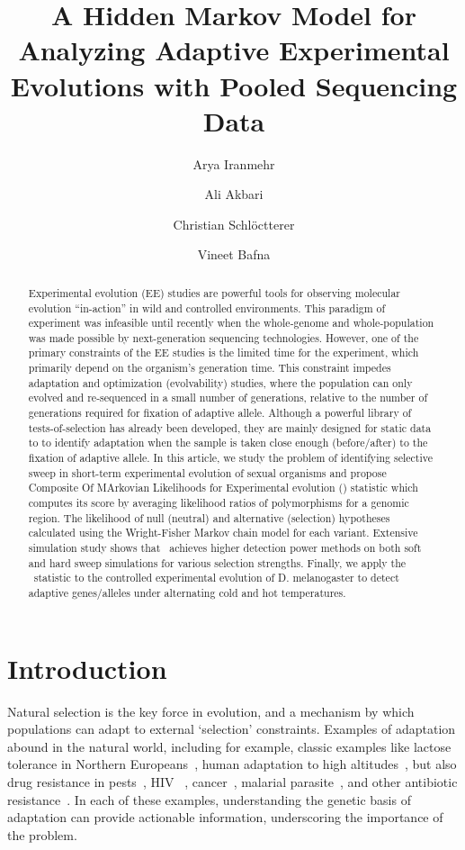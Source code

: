 \documentclass[11pt]{article}
\title{A Hidden Markov Model for Analyzing Adaptive Experimental Evolutions with Pooled Sequencing Data}
\author[1]{Arya Iranmehr}
\author[1]{Ali Akbari}
\author[2]{Christian Schl\"{o}ctterer}
\author[3]{Vineet Bafna}
\affil[1]{\footnotesize Electrical and Computer Engineering, University of California, San Diego, La Jolla, CA 92093, USA.}
\affil[2]{\footnotesize Institut für Populationsgenetik, Vetmeduni, Vienna, Austria.}
\affil[3]{\footnotesize Computer Science \& Engineering, University of California, San Diego, La Jolla, CA 92093, USA}
\date{}
\def\comale{\text{COMALE }}
\begin{document}
\maketitle
\begin{abstract}
  Experimental evolution (EE) studies are powerful tools for observing
  molecular evolution ``in-action'' in wild and controlled
  environments. This paradigm of experiment was infeasible until
  recently when the whole-genome and whole-population was made
  possible by next-generation sequencing technologies.  However, one
  of the primary constraints of the EE studies is the limited time for
  the experiment, which primarily depend on the organism's generation
  time. This constraint impedes adaptation and optimization
  (evolvability) studies, where the population can only evolved and
  re-sequenced in a small number of generations, relative to the
  number of generations required for fixation of adaptive allele.
  Although a powerful library of tests-of-selection has already been
  developed, they are mainly designed for static data to to identify
  adaptation when the sample is taken close enough (before/after) to
  the fixation of adaptive allele.  In this article, we study the
  problem of identifying selective sweep in short-term experimental
  evolution of sexual organisms and propose Composite Of MArkovian
  Likelihoods for Experimental evolution (\comale) statistic which
  computes its score by averaging likelihood ratios of polymorphisms
  for a genomic region.  The likelihood of null (neutral) and
  alternative (selection) hypotheses calculated using the
  Wright-Fisher Markov chain model for each variant. Extensive
  simulation study shows that \comale\ achieves higher detection power
  methods on both soft and hard sweep simulations for various
  selection strengths.  Finally, we apply the \comale\ statistic to
  the controlled experimental evolution of D. melanogaster to detect
  adaptive genes/alleles under alternating cold and hot temperatures.
\end{abstract}



\section{Introduction}

Natural selection is the key force in evolution, and a mechanism by
which populations can adapt to external `selection'
constraints. Examples of adaptation abound in the natural world,
including for example, classic examples like lactose tolerance in
Northern Europeans~\cite{XXX}, human adaptation to high
altitudes~\cite{}, but also drug resistance in
pests~\cite{daborn2001ddt}, HIV ~\cite{Feder2016More},
cancer~\cite{gottesman2002mechanisms,zahreddine2013mechanisms},
malarial parasite~\cite{ariey2014molecular,nair2007recurrent}, and
other antibiotic resistance~\cite{spellberg2008epidemic}. In each of
these examples, understanding the genetic basis of adaptation can
provide actionable information, underscoring the importance of the
problem.
\end{document}
